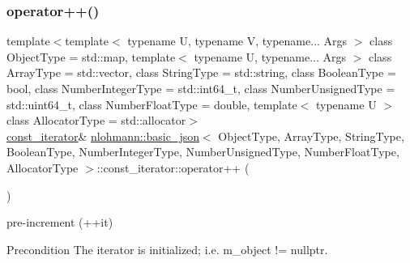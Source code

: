 \subsubsection{\texorpdfstring{operator++()}{operator++()}\hspace{0.1cm}{\footnotesize\ttfamily [2/2]}}
{\footnotesize\ttfamily template$<$template$<$ typename U, typename V, typename... Args $>$ class Object\+Type = std\+::map, template$<$ typename U, typename... Args $>$ class Array\+Type = std\+::vector, class String\+Type  = std\+::string, class Boolean\+Type  = bool, class Number\+Integer\+Type  = std\+::int64\+\_\+t, class Number\+Unsigned\+Type  = std\+::uint64\+\_\+t, class Number\+Float\+Type  = double, template$<$ typename U $>$ class Allocator\+Type = std\+::allocator$>$ \\
\hyperlink{classnlohmann_1_1basic__json_1_1const__iterator}{const\+\_\+iterator}\& \hyperlink{classnlohmann_1_1basic__json}{nlohmann\+::basic\+\_\+json}$<$ Object\+Type, Array\+Type, String\+Type, Boolean\+Type, Number\+Integer\+Type, Number\+Unsigned\+Type, Number\+Float\+Type, Allocator\+Type $>$\+::const\+\_\+iterator\+::operator++ (\begin{DoxyParamCaption}{ }\end{DoxyParamCaption})\hspace{0.3cm}{\ttfamily [inline]}}



pre-\/increment (++it) 

\begin{DoxyPrecond}{Precondition}
The iterator is initialized; i.\+e. {\ttfamily m\+\_\+object != nullptr}. 
\end{DoxyPrecond}
\mbox{\label{classnlohmann_1_1basic__json_1_1const__iterator_a0d5820d1dda9dea3bbeb029cacf68522}} 
